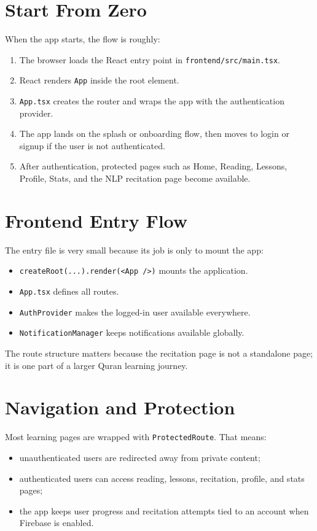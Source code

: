 \documentclass[11pt,a4paper]{article}
\begin{document}
\section{Start From Zero}
When the app starts, the flow is roughly:
\begin{enumerate}
  \item The browser loads the React entry point in \texttt{frontend/src/main.tsx}.
  \item React renders \texttt{App} inside the root element.
  \item \texttt{App.tsx} creates the router and wraps the app with the authentication provider.
  \item The app lands on the splash or onboarding flow, then moves to login or signup if the user is not authenticated.
  \item After authentication, protected pages such as Home, Reading, Lessons, Profile, Stats, and the NLP recitation page become available.
\end{enumerate}

\section{Frontend Entry Flow}
The entry file is very small because its job is only to mount the app:
\begin{itemize}
  \item \texttt{createRoot(...).render(<App />)} mounts the application.
  \item \texttt{App.tsx} defines all routes.
  \item \texttt{AuthProvider} makes the logged-in user available everywhere.
  \item \texttt{NotificationManager} keeps notifications available globally.
\end{itemize}

The route structure matters because the recitation page is not a standalone page; it is one part of a larger Quran learning journey.

\section{Navigation and Protection}
Most learning pages are wrapped with \texttt{ProtectedRoute}. That means:
\begin{itemize}
  \item unauthenticated users are redirected away from private content;
  \item authenticated users can access reading, lessons, recitation, profile, and stats pages;
  \item the app keeps user progress and recitation attempts tied to an account when Firebase is enabled.
\end{itemize}
\end{document}

